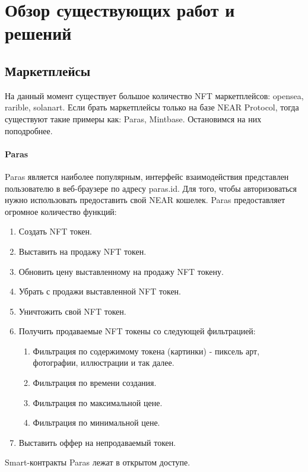 \section{Обзор существующих работ и решений}
\label{section.theory}
\subsection{Маркетплейсы}
На данный момент существует большое количество NFT маркетплейсов: opensea\cite{opensea}, rarible\cite{rarible}, solanart\cite{solanart}. Если брать маркетплейсы только на базе NEAR Protocol, тогда существуют такие примеры как: Paras\cite{paras}, Mintbase\cite{mintbase}. Остановимся на них поподробнее.

\paragraph{Paras}

Paras является наиболее популярным, интерфейс взаимодействия представлен пользователю в веб-браузере по адресу paras.id. Для того, чтобы авторизоваться нужно использовать
предоставить свой NEAR кошелек. Paras предоставляет огромное количество функций:
\begin{enumerate}
    \item Создать NFT токен.
    \item Выставить на продажу NFT токен.
    \item Обновить цену выставленному на продажу NFT токену.
    \item Убрать с продажи выставленной NFT токен.
    \item Уничтожить свой NFT токен.
    \item Получить продаваемые NFT токены со следующей фильтрацией:
        \begin{enumerate}
            \item Фильтрация по содержимому токена (картинки) - пиксель арт, фотографии, иллюстрации и так далее.
            \item Фильтрация по времени создания.
            \item Фильтрация по максимальной цене.
            \item Фильтрация по минимальной цене.
        \end{enumerate}
    \item Выставить оффер на непродаваемый токен.
\end{enumerate}

Smart-контракты Paras лежат в открытом доступе\cite{parasnftcontract, parasmarketplacecontract}.

